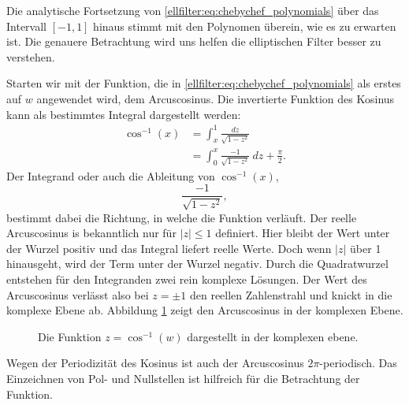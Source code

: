 Die analytische Fortsetzung von \eqref{ellfilter:eq:chebychef_polynomials} über das Intervall $[-1,1]$ hinaus stimmt mit den Polynomen überein, wie es zu erwarten ist.
Die genauere Betrachtung wird uns helfen die elliptischen Filter besser zu verstehen.

Starten wir mit der Funktion, die in \eqref{ellfilter:eq:chebychef_polynomials} als erstes auf $w$ angewendet wird, dem Arcuscosinus.
Die invertierte Funktion des Kosinus kann als bestimmtes Integral dargestellt werden:
\begin{align}
    \cos^{-1}(x)
    &=
    \int_{x}^{1}
    \frac{
        dz
    }{
        \sqrt{
            1-z^2
        }
    }\\
    &=
    \int_{0}^{x}
    \frac{
        -1
    }{
        \sqrt{
            1-z^2
        }
    }
    ~dz
    + \frac{\pi}{2}.
\end{align}
Der Integrand oder auch die Ableitung von $\cos^{-1}(x)$,
\begin{equation}
    \frac{
        -1
    }{
        \sqrt{
            1-z^2
        }
    },
\end{equation}
bestimmt dabei die Richtung, in welche die Funktion verläuft.
Der reelle Arcuscosinus is bekanntlich nur für $|z| \leq 1$ definiert.
Hier bleibt der Wert unter der Wurzel positiv und das Integral liefert reelle Werte.
Doch wenn $|z|$ über 1 hinausgeht, wird der Term unter der Wurzel negativ.
Durch die Quadratwurzel entstehen für den Integranden zwei rein komplexe Lösungen.
Der Wert des Arcuscosinus verlässt also bei $z= \pm 1$ den reellen Zahlenstrahl und knickt in die komplexe Ebene ab.
Abbildung \ref{ellfilter:fig:arccos} zeigt den Arcuscosinus in der komplexen Ebene.
\begin{figure}
    \centering
    
    \caption{Die Funktion $z = \cos^{-1}(w)$ dargestellt in der komplexen ebene.}
    \label{ellfilter:fig:arccos}
\end{figure}
Wegen der Periodizität des Kosinus ist auch der Arcuscosinus $2\pi$-periodisch.
Das Einzeichnen von Pol- und Nullstellen ist hilfreich für die Betrachtung der Funktion.



